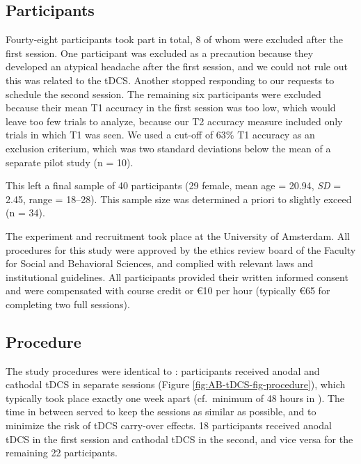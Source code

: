 \documentclass[11pt,english,]{memoir}
\begin{document}
\hypertarget{AB_tDCS-participants}{%
\subsection{Participants}\label{AB_tDCS-participants}}

Fourty-eight participants took part in total, 8 of whom were excluded after the first session. One participant was excluded as a precaution because they developed an atypical headache after the first session, and we could not rule out this was related to the tDCS. Another stopped responding to our requests to schedule the second session. The remaining six participants were excluded because their mean T1 accuracy in the first session was too low, which would leave too few trials to analyze, because our T2 accuracy measure included only trials in which T1 was seen. We used a cut-off of 63\% T1 accuracy as an exclusion criterium, which was two standard deviations below the mean of a separate pilot study (n = 10).

This left a final sample of 40 participants (29 female, mean age = 20.94, \emph{SD} = 2.45, range = 18--28). This sample size was determined a priori to slightly exceed \textcite{London2015} (n = 34).

The experiment and recruitment took place at the University of Amsterdam. All procedures for this study were approved by the ethics review board of the Faculty for Social and Behavioral Sciences, and complied with relevant laws and institutional guidelines. All participants provided their written informed consent and were compensated with course credit or €10 per hour (typically €65 for completing two full sessions).

\hypertarget{AB_tDCS-procedure}{%
\subsection{Procedure}\label{AB_tDCS-procedure}}

The study procedures were identical to \textcite{London2015}: participants received anodal and cathodal tDCS in separate sessions (Figure \ref{fig:AB-tDCS-fig-procedure}), which typically took place exactly one week apart (cf.~minimum of 48 hours in \textcite{London2015}). The time in between served to keep the sessions as similar as possible, and to minimize the risk of tDCS carry-over effects. 18 participants received anodal tDCS in the first session and cathodal tDCS in the second, and vice versa for the remaining 22 participants.
\end{document}
